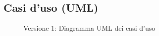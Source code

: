 \subsection{Casi d'uso (UML)}
\vspace{0.5cm}
\begin{figure}[H]
    \centering
    \caption{Versione 1: Diagramma UML dei casi d'uso}
    \label{fig:use_case_uml_v1}
\end{figure}